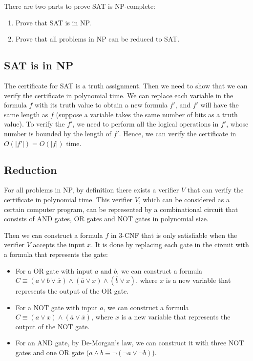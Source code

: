 \documentclass[a4paper,12pt]{article}
\begin{document}
There are two parts to prove SAT is NP-complete:
\begin{enumerate}
	\item Prove that SAT is in NP.
	\item Prove that all problems in NP can be reduced to SAT.
\end{enumerate}

\subsection{SAT is in NP}

The certificate for SAT is a truth assignment.
Then we need to show that we can verify the certificate in polynomial time.
We can replace each variable in the formula $f$ with its truth value to obtain a new formula $f'$, and $f'$ will have the same length as $f$ (suppose a variable takes the same number of bits as a truth value).
To verify the $f'$, we need to perform all the logical operations in $f'$, whose number is bounded by the length of $f'$.
Hence, we can verify the certificate in $O(|f'|) = O(|f|)$ time.

\subsection{Reduction}

For all problems in NP, by definition there exists a verifier $V$ that can verify the certificate in polynomial time.
This verifier $V$, which can be considered as a certain computer program, can be represented by a combinational circuit that consists of AND gates, OR gates and NOT gates in polynomial size.

Then we can construct a formula $f$ in 3-CNF that is only satisfiable when the verifier $V$ accepts the input $x$.
It is done by replacing each gate in the circuit with a formula that represents the gate:
\begin{itemize}
	\item For a OR gate with input $a$ and $b$, we can construct a formula $C \equiv (a \vee b \vee \overline{x}) \wedge (\overline{a} \vee x) \wedge (\overline{b} \vee x)$, where $x$ is a new variable that represents the output of the OR gate.
	\item For a NOT gate with input $a$, we can construct a formula $C \equiv (a \vee x) \wedge (\overline{a} \vee \overline{x})$, where $x$ is a new variable that represents the output of the NOT gate.
	\item For an AND gate, by De-Morgan's law, we can construct it with three NOT gates and one OR gate ($a \wedge b \equiv \neg (\neg a \vee \neg b)$).
\end{itemize}
\end{document}
